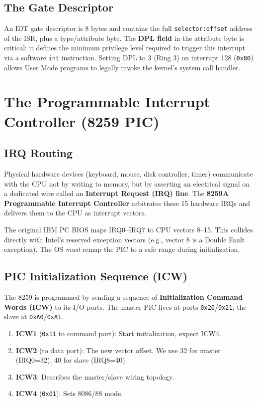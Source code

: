 \documentclass[12pt,a4paper]{report}
\begin{document}
\subsection{The Gate Descriptor}

An IDT gate descriptor is 8 bytes and contains the full \texttt{selector:offset}
address of the ISR, plus a type/attribute byte. The \textbf{DPL field} in the
attribute byte is critical: it defines the minimum privilege level required to
trigger this interrupt via a software \texttt{int} instruction. Setting DPL to 3
(Ring 3) on interrupt 128 (\texttt{0x80}) allows User Mode programs to legally
invoke the kernel's system call handler.

\section{The Programmable Interrupt Controller (8259 PIC)}

\subsection{IRQ Routing}

Physical hardware devices (keyboard, mouse, disk controller, timer) communicate with
the CPU not by writing to memory, but by asserting an electrical signal on a dedicated
wire called an \textbf{Interrupt Request (IRQ) line}. The \textbf{8259A Programmable
Interrupt Controller} arbitrates these 15 hardware IRQs and delivers them to the
CPU as interrupt vectors.

The original IBM PC BIOS maps IRQ0--IRQ7 to CPU vectors 8--15. This collides directly
with Intel's reserved exception vectors (e.g., vector 8 is a Double Fault exception).
The OS \textit{must} remap the PIC to a safe range during initialization.

\subsection{PIC Initialization Sequence (ICW)}

The 8259 is programmed by sending a sequence of \textbf{Initialization Command Words
(ICW)} to its I/O ports. The master PIC lives at ports \texttt{0x20}/\texttt{0x21};
the slave at \texttt{0xA0}/\texttt{0xA1}.

\begin{enumerate}
    \item \textbf{ICW1} (\texttt{0x11} to command port): Start initialization, expect ICW4.
    \item \textbf{ICW2} (to data port): The new vector offset. We use 32 for master (IRQ0=32),
    40 for slave (IRQ8=40).
    \item \textbf{ICW3}: Describes the master/slave wiring topology.
    \item \textbf{ICW4} (\texttt{0x01}): Sets 8086/88 mode.
\end{enumerate}
\end{document}
